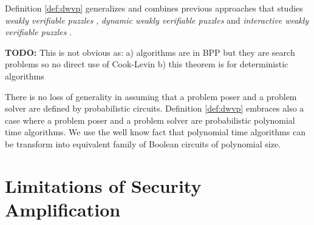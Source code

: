 \documentclass[11pt,a4paper,titlepage]{memoir}
\begin{document}
Definition \ref{def:dwvp} generalizes and combines previous approaches that studies
\textit{weakly verifiable puzzles} \cite{canetti2004hardness},
\textit{dynamic weakly verifiable puzzles} \cite{Dodis:2009:SAI:1530441.1530450}
and \textit{interactive weakly verifiable puzzles} \cite{DBLP:journals/corr/abs-1002-3534}.

\begin{todo}
  \textbf{TODO:}
  This is not obvious as:
  a) algorithms are in BPP but they are search problems so no direct use of Cook-Levin
  b) this theorem is for deterministic algorithms
\end{todo}

There is no loss of generality in assuming that a problem poser and a problem solver are defined by probabilistic circuits.
Definition \ref{def:dwvp} embraces also a case where a problem poser and a problem solver are probabilistic polynomial time algorithms.
We use the well know fact \cite{LectureNotesCT} that polynomial time algorithms can be transform into equivalent family of Boolean circuits of polynomial size.



\section{Limitations of Security Amplification}


\appendix


\backmatter



\end{document}
